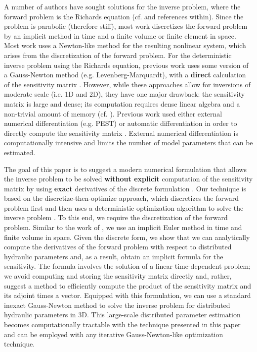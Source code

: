 \documentclass[preprint,review,3p,times,onecolumn,authoryear]{elsarticle}
\begin{document}
A number of authors have sought solutions for the inverse problem, where the forward problem is the Richards equation (cf. \cite{Bitterlich2002, Iden2007, hydrusCalibration2012} and references within). Since the problem is parabolic (therefore stiff), most work discretizes the forward problem by an implicit method in time and a finite volume or finite element in space. Most work uses a Newton-like method for the resulting nonlinear system, which arises from the discretization of the forward problem. For the deterministic inverse problem using the Richards equation, previous work uses some version of a Gauss-Newton method (e.g. Levenberg-Marquardt), with a {\bf direct} calculation of the sensitivity matrix \citep{Finsterle2011, Simunek1996, Bitterlich2002}. However, while these approaches allow for inversions of moderate scale (i.e. 1D and 2D), they have one major drawback: the sensitivity matrix is large and dense; its computation requires dense linear algebra and a non-trivial amount of memory (cf. \cite{Towara2015}). Previous work used either external numerical differentiation (e.g. PEST) or automatic differentiation in order to directly compute the sensitivity matrix \citep{Finsterle2011c, Bitterlich2002, Doherty2015, Towara2015, Liu2017}. External numerical differentiation is computationally intensive and limits the number of model parameters that can be estimated.

The goal of this paper is to suggest a modern numerical formulation that allows the inverse problem to be solved {\bf without explicit} computation of the sensitivity matrix by using {\bf exact} derivatives of the discrete formulation \citep{hao}. Our technique is based on the discretize-then-optimize approach, which discretizes the forward problem first and then uses a deterministic optimization algorithm to solve the inverse problem \citep{Gunz03}. To this end, we require the discretization of the forward problem. Similar to the work of \cite{Celia1990}, we use an implicit Euler method in time and finite volume in space. Given the discrete form, we show that we can analytically compute the derivatives of the forward problem with respect to distributed hydraulic parameters and, as a result, obtain an implicit formula for the sensitivity. The formula involves the solution of a linear time-dependent problem; we avoid computing and storing the sensitivity matrix directly and, rather, suggest a method to efficiently compute the product of the sensitivity matrix and its adjoint times a vector. Equipped with this formulation, we can use a standard inexact Gauss-Newton method to solve the inverse problem for distributed hydraulic parameters in 3D. This large-scale distributed parameter estimation becomes computationally tractable with the technique presented in this paper and can be employed with any iterative Gauss-Newton-like optimization technique.
\end{document}
